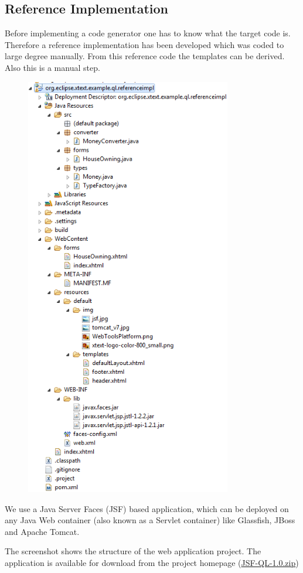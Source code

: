 
\subsection{Reference Implementation}

Before implementing a code generator one has to know what the target code is. Therefore a reference implementation has been
developed which was coded to large degree manually. From this reference code the templates can be derived. Also this is a
manual step.
\begin{figure}
 \includegraphics[width=9cm]{./images/chapter02/referenceimpl_projecttree.png}
\end{figure}
We use a Java Server Faces (JSF) based application, which can be deployed on any
Java Web container (also known as a Servlet container) like Glassfish, JBoss and Apache Tomcat.

The screenshot shows the structure of the web application project. The application is available for download from the project 
homepage (\href{http://lwc13-xtext.eclipselabs.org.codespot.com/files/JSF-QL-1.0.zip}{JSF-QL-1.0.zip})
 
